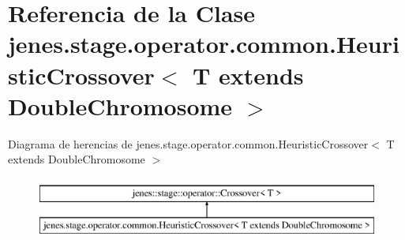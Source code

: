 \hypertarget{classjenes_1_1stage_1_1operator_1_1common_1_1_heuristic_crossover_3_01_t_01extends_01_double_chromosome_01_4}{\section{Referencia de la Clase jenes.\-stage.\-operator.\-common.\-Heuristic\-Crossover$<$ T extends Double\-Chromosome $>$}
\label{classjenes_1_1stage_1_1operator_1_1common_1_1_heuristic_crossover_3_01_t_01extends_01_double_chromosome_01_4}
}
Diagrama de herencias de jenes.\-stage.\-operator.\-common.\-Heuristic\-Crossover$<$ T extends Double\-Chromosome $>$\begin{figure}[H]
\begin{center}
\leavevmode
\includegraphics[height=2.000000cm]{classjenes_1_1stage_1_1operator_1_1common_1_1_heuristic_crossover_3_01_t_01extends_01_double_chromosome_01_4}
\end{center}
\end{figure}
